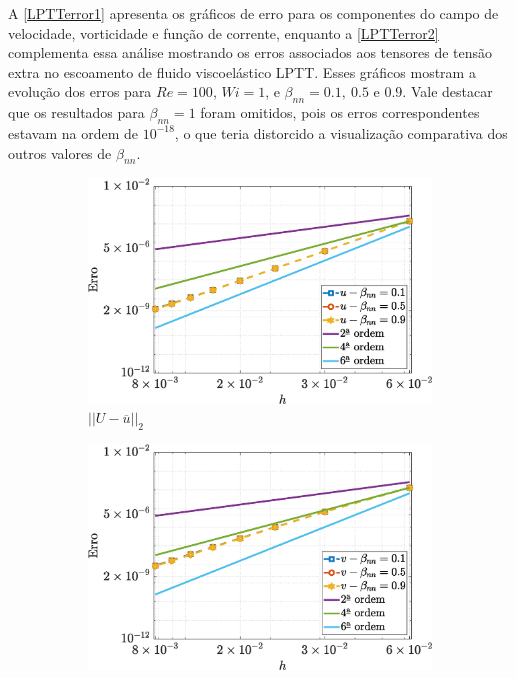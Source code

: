 A \autoref{LPTTerror1} apresenta os gráficos de erro para os componentes do campo de velocidade, vorticidade e função de corrente, enquanto a \autoref{LPTTerror2} complementa essa análise mostrando os erros associados aos tensores de tensão extra no escoamento de fluido viscoelástico LPTT. Esses gráficos mostram a evolução dos erros para $Re = 100$, $Wi = 1$, e $\beta_{nn} = 0.1,\ 0.5$ e  $0.9$. Vale destacar que os resultados para $\beta_{nn} = 1$ foram omitidos, pois os erros correspondentes estavam na ordem de $10^{-18}$, o que teria distorcido a visualização comparativa dos outros valores de $\beta_{nn}$.
\begin{figure}[H] 
    \centering 
    \caption{Erro para o campo de velocidade $(\overline{u},\tilde{v})$, vorticidade $(\tilde{\omega_{z}})$, e função de corrente $(\tilde{\psi})$, considerando $Re=100$, $Wi=1$, $\epsilon = 0.5$ e $\xi = 0.1$, para o escoamento de fluido viscoelástico com o modelo LPTT}\label{LPTTerror1}
     \begin{subfigure}[b]{.47\textwidth}
        \includegraphics[width=\textwidth]{figures/Case12/LPTT/Errors/NormErr_2nd_Re_100_Wi_1_epsilon_0.5_xi_0.1_alphaG_0_Dt_1e-06_at_0.05_tipsim_1_MMS_12_U.eps}
        \caption{$||U - \overline{u}||_{2}$}
        \label{error_u_2nd_Case1_LPTT_eps_05}
    \end{subfigure}
    \vspace{0.2cm}
    \qquad
    \begin{subfigure}[b]{.47\textwidth}
        \includegraphics[width=\textwidth]{figures/Case12/LPTT/Errors/NormErr_2nd_Re_100_Wi_1_epsilon_0.5_xi_0.1_alphaG_0_Dt_1e-06_at_0.05_tipsim_1_MMS_12_V.eps}

\end{subfigure}
\end{figure}
